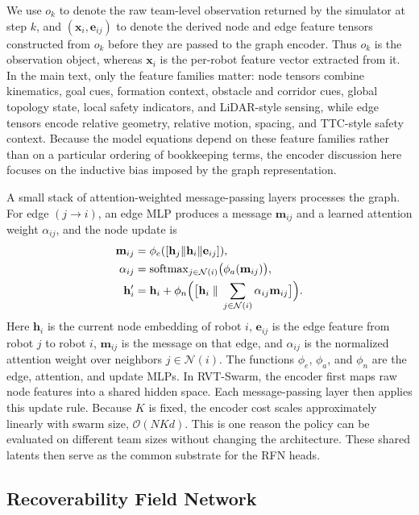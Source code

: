 \documentclass{ieeeaccess}
\newcommand{\cN}{\mathcal{N}}
\begin{document}
We use $o_k$ to denote the raw team-level observation returned by the
simulator at step $k$, and $(\mathbf{x}_i,\mathbf{e}_{ij})$ to denote
the derived node and edge feature tensors constructed from $o_k$ before
they are passed to the graph encoder. Thus $o_k$ is the observation
object, whereas $\mathbf{x}_i$ is the per-robot feature vector extracted
from it. In the main text, only the feature families matter: node tensors
combine kinematics, goal cues, formation context, obstacle and corridor
cues, global topology state, local safety indicators, and LiDAR-style
sensing, while edge tensors encode relative geometry, relative motion,
spacing, and TTC-style safety context. Because the model equations depend
on these feature families rather than on a particular ordering of
bookkeeping terms, the encoder discussion here focuses on the inductive
bias imposed by the graph representation.

A small stack of attention-weighted message-passing layers processes the
graph. For edge $(j \rightarrow i)$, an edge MLP produces a message
$\mathbf{m}_{ij}$ and a learned attention weight $\alpha_{ij}$, and the
node update is
\begin{align}
\mathbf{m}_{ij} &= \phi_e([\mathbf{h}_j \| \mathbf{h}_i \|
\mathbf{e}_{ij}]), \\
\alpha_{ij} &= \operatorname{softmax}_{j \in \cN(i)}
\bigl(\phi_a(\mathbf{m}_{ij})\bigr), \\
\mathbf{h}_i' &= \mathbf{h}_i +
\phi_n\Bigl(\bigl[\mathbf{h}_i \;\|\;
\sum_{j\in\cN(i)}\alpha_{ij}\mathbf{m}_{ij}\bigr]\Bigr).
\end{align}
Here $\mathbf{h}_i$ is the current node embedding of robot $i$,
$\mathbf{e}_{ij}$ is the edge feature from robot $j$ to robot $i$,
$\mathbf{m}_{ij}$ is the message on that edge, and $\alpha_{ij}$ is the
normalized attention weight over neighbors $j\in\cN(i)$. The functions
$\phi_e$, $\phi_a$, and $\phi_n$ are the edge, attention, and update
MLPs. In RVT-Swarm, the encoder first maps raw node features into a
shared hidden space. Each message-passing layer then applies this
update rule. Because $K$ is fixed, the encoder cost scales
approximately linearly with swarm size, $\mathcal{O}(NKd)$. This is
one reason the policy can be evaluated on different team sizes without
changing the architecture. These shared latents then serve as the
common substrate for the RFN heads.

\subsection{Recoverability Field Network}
\label{sec:rfn}
\end{document}
